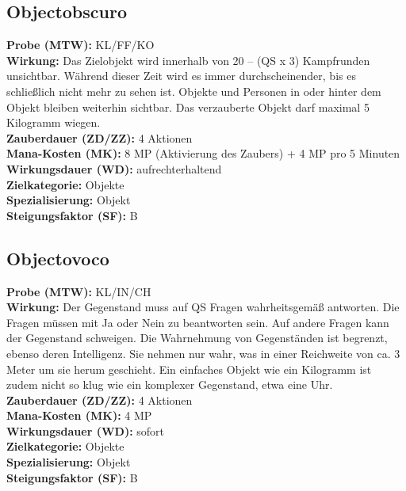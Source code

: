 \subsection{Objectobscuro}
\label{chap:objectobscuro}
\textbf{Probe (MTW):} KL/FF/KO \\
\textbf{Wirkung:} Das Zielobjekt wird innerhalb von 20 – (QS x 3) Kampfrunden unsichtbar. Während dieser Zeit wird es immer durchscheinender, bis es schließlich nicht mehr zu sehen ist. Objekte und Personen in oder hinter dem Objekt bleiben weiterhin sichtbar. Das verzauberte Objekt darf maximal 5 Kilogramm wiegen.\\
\textbf{Zauberdauer (ZD/ZZ):} 4 Aktionen \\
\textbf{Mana-Kosten (MK):} 8 MP (Aktivierung des Zaubers) + 4 MP pro 5 Minuten \\
\textbf{Wirkungsdauer (WD):} aufrechterhaltend \\
\textbf{Zielkategorie:} Objekte \\
\textbf{Spezialisierung:} Objekt \\
\textbf{Steigungsfaktor (SF):} B


\subsection{Objectovoco}
\label{chap:objectovoco}
\textbf{Probe (MTW):} KL/IN/CH \\
\textbf{Wirkung:} Der Gegenstand muss auf QS Fragen wahrheitsgemäß antworten. Die Fragen müssen mit Ja oder Nein zu beantworten sein. Auf andere Fragen kann der Gegenstand schweigen. Die Wahrnehmung von Gegenständen ist begrenzt, ebenso deren Intelligenz. Sie nehmen nur wahr, was in einer Reichweite von ca. 3 Meter um sie herum geschieht. Ein einfaches Objekt wie ein Kilogramm ist zudem nicht so klug wie ein komplexer Gegenstand, etwa eine Uhr.\\
\textbf{Zauberdauer (ZD/ZZ):} 4 Aktionen \\
\textbf{Mana-Kosten (MK):} 4 MP \\
\textbf{Wirkungsdauer (WD):} sofort \\
\textbf{Zielkategorie:} Objekte \\
\textbf{Spezialisierung:} Objekt \\
\textbf{Steigungsfaktor (SF):} B


